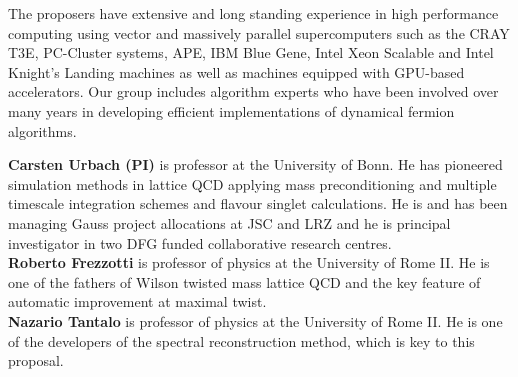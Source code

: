 The proposers have extensive and long standing experience in high
performance computing using vector and massively parallel
supercomputers such as the CRAY T3E, PC-Cluster systems, APE, IBM
Blue Gene, Intel Xeon Scalable and Intel Knight's Landing machines as well
as machines equipped with GPU-based accelerators.
Our group includes algorithm experts who have been involved over many years in
developing efficient implementations of dynamical fermion algorithms.

\noindent\textbf{Carsten Urbach (PI)} is professor at the University
of Bonn. He has pioneered simulation methods in lattice QCD applying
mass preconditioning and multiple timescale integration schemes and
flavour singlet calculations. He is and has been managing Gauss
project allocations at JSC and LRZ and he is principal investigator in
two DFG funded collaborative research centres.\\
\noindent\textbf{Roberto Frezzotti} is professor of physics at the
University of Rome II. He is one of the fathers of Wilson twisted mass
lattice QCD and the key feature of automatic improvement at maximal
twist.\\ 
\noindent\textbf{Nazario Tantalo} is professor of physics at the
University of Rome II. He is one of the developers of the spectral
reconstruction method, which is key to this proposal.
